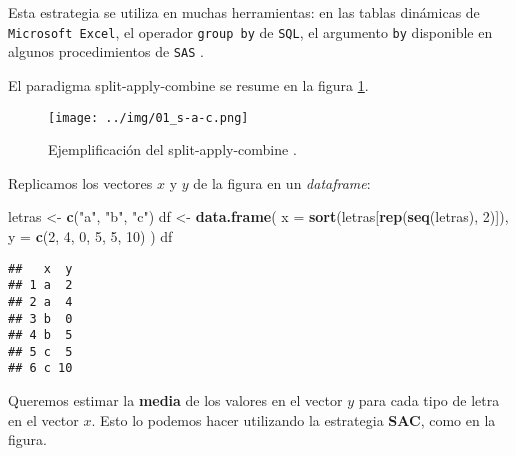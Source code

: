 \documentclass[]{article}
\newenvironment{Shaded}{\begin{snugshade}}{\end{snugshade}}
\newcommand{\KeywordTok}[1]{\textcolor[rgb]{0.13,0.29,0.53}{\textbf{#1}}}
\newcommand{\DataTypeTok}[1]{\textcolor[rgb]{0.13,0.29,0.53}{#1}}
\newcommand{\DecValTok}[1]{\textcolor[rgb]{0.00,0.00,0.81}{#1}}
\newcommand{\StringTok}[1]{\textcolor[rgb]{0.31,0.60,0.02}{#1}}
\newcommand{\CommentTok}[1]{\textcolor[rgb]{0.56,0.35,0.01}{\textit{#1}}}
\newcommand{\ControlFlowTok}[1]{\textcolor[rgb]{0.13,0.29,0.53}{\textbf{#1}}}
\newcommand{\OperatorTok}[1]{\textcolor[rgb]{0.81,0.36,0.00}{\textbf{#1}}}
\newcommand{\NormalTok}[1]{#1}
\begin{document}
Esta estrategia se utiliza en muchas herramientas: en las tablas
dinámicas de \texttt{Microsoft\ Excel}, el operador \texttt{group\ by}
de \texttt{SQL}, el argumento \texttt{by} disponible en algunos
procedimientos de \texttt{SAS} \parencite{wickham2011split}.

El paradigma split-apply-combine se resume en la figura \ref{fig:sac}.

\begin{figure}[h]
    \centering
    \texttt{[image: ../img/01\_s-a-c.png]}
    \caption{Ejemplificación del split-apply-combine \textcite[Split-Apply-Combine]{vaidyanathan2014r}.}
    \label{fig:sac}
\end{figure}

Replicamos los vectores \(x\) y \(y\) de la figura en un
\emph{dataframe}:

\begin{Shaded}
\begin{Highlighting}[]
\NormalTok{letras <-}\StringTok{ }\KeywordTok{c}\NormalTok{(}\StringTok{"a"}\NormalTok{, }\StringTok{"b"}\NormalTok{, }\StringTok{"c"}\NormalTok{)}
\NormalTok{df <-}\StringTok{ }\KeywordTok{data.frame}\NormalTok{(}
  \DataTypeTok{x =} \KeywordTok{sort}\NormalTok{(letras[}\KeywordTok{rep}\NormalTok{(}\KeywordTok{seq}\NormalTok{(letras), }\DecValTok{2}\NormalTok{)]),}
  \DataTypeTok{y =} \KeywordTok{c}\NormalTok{(}\DecValTok{2}\NormalTok{, }\DecValTok{4}\NormalTok{, }\DecValTok{0}\NormalTok{, }\DecValTok{5}\NormalTok{, }\DecValTok{5}\NormalTok{, }\DecValTok{10}\NormalTok{)}
\NormalTok{)}
\NormalTok{df}
\end{Highlighting}
\end{Shaded}

\begin{verbatim}
##   x  y
## 1 a  2
## 2 a  4
## 3 b  0
## 4 b  5
## 5 c  5
## 6 c 10
\end{verbatim}

Queremos estimar la \textbf{media} de los valores en el vector \(y\)
para cada tipo de letra en el vector \(x\). Esto lo podemos hacer
utilizando la estrategia \textbf{SAC}, como en la figura.

\begin{Shaded}
\end{Shaded}
\end{document}
